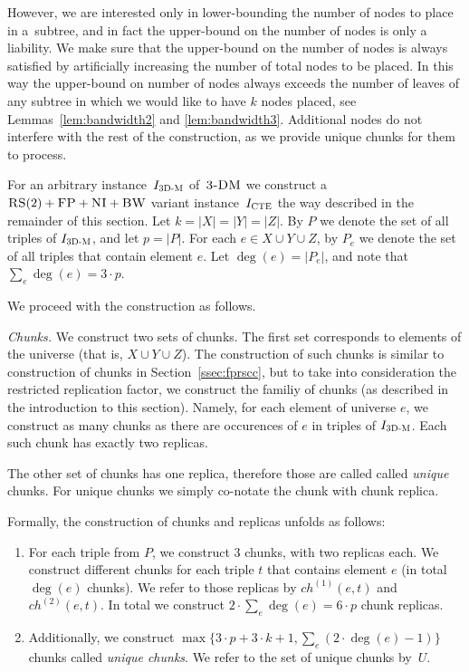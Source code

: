 However, we are interested only in lower-bounding the number of nodes to place in a~subtree, and in fact the upper-bound on the number of nodes is only a liability.
We make sure that the upper-bound on the number of nodes is always satisfied by artificially increasing the number of total nodes to be placed.
In this way the upper-bound on number of nodes always exceeds the number of leaves of any subtree in which we would like to have $k$ nodes placed, see Lemmas~\ref{lem:bandwidth2} and \ref{lem:bandwidth3}.
Additional nodes do not interfere with the rest of the construction, as we provide unique chunks for them to process.



For an arbitrary instance~$I_{\mathrm{\textsc{3D-M}}}$ of~$\textsc{3-DM}$ we construct a~$\textsc{RS}(2)+\textsc{FP}+\textsc{NI}+\textsc{BW}$ variant instance~$I_{\mathrm{\textsc{CTE}}}$ the way described in the remainder of this section.
Let $k = |X|=|Y|=|Z|$.
By $P$ we denote the set of all triples of $I_{\mathrm{\textsc{3D-M}}}$, and let $p = |P|$.
For each $e\in X\cup Y\cup Z$, by $P_e$ we denote the set of all triples that contain element $e$.
Let $\deg(e) = |P_e|$, and note that $\sum_e \deg(e) = 3\cdot p$.

We proceed with the construction as follows.

\emph{Chunks.}
We construct two sets of chunks.
The first set corresponds to elements of the universe (that is, $X\cup Y\cup Z$).
The construction of such chunks is similar to construction of chunks in Section~\ref{ssec:fprscc}, but to take into consideration the restricted replication factor, we construct the familiy of chunks (as described in the introduction to this section).
Namely, for each element of universe $e$, we construct as many chunks as there are occurences of $e$ in triples of $I_{\mathrm{\textsc{3D-M}}}$.
Each such chunk has exactly two replicas.

The other set of chunks has one replica, therefore those are called called \emph{unique} chunks.
For unique chunks we simply co-notate the chunk with chunk replica.

Formally, the construction of chunks and replicas unfolds as follows:
\begin{enumerate}
  \item For each triple from $P$, we construct $3$ chunks, with two replicas each.
  We construct different chunks for each triple $t$ that contains element $e$ (in total $\deg(e)$ chunks).
  We refer to those replicas by $ch^{(1)}(e, t)$ and $ch^{(2)}(e, t)$.
  In total we construct $2\cdot \sum_e\deg(e) = 6\cdot p$ chunk replicas.
  \item Additionally, we construct
$\max\{3\cdot p + 3\cdot k + 1, \sum_e(2\cdot \deg(e)-1)\}$
chunks called \emph{unique chunks}. We
refer to the set of unique chunks by~$U$.
\end{enumerate}

